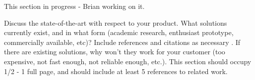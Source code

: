 This section in progress - Brian working on it.

Discuss the state-of-the-art with respect to your product. What solutions currently exist, and in what form (academic research, enthusiast prototype, commercially available, etc)? Include references and citations as necessary \cite{Rubin2012}. If there are existing solutions, why won't they work for your customer (too expensive, not fast enough, not reliable enough, etc.). This section should occupy 1/2 - 1 full page, and should include at least 5 references to related work.